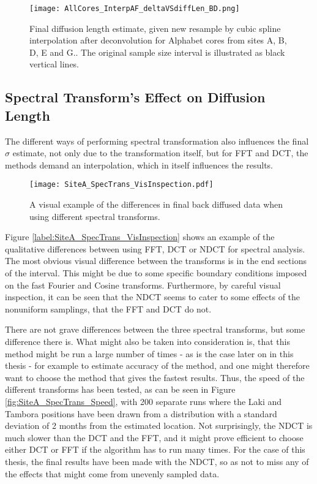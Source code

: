 \documentclass[../../CompleteThesis2/Complete_2ndDraft]{subfiles}
\begin{document}
\begin{figure}[!htb]
	\centering
	\texttt{[image: AllCores\_InterpAF\_deltaVSdiffLen\_BD.png]}
	\caption[Diffusion length versus resampling size after deconvolution, all cores.]{\small Final diffusion length estimate, given new resample by cubic spline interpolation after deconvolution for Alphabet cores from sites A, B, D, E and G.. The original sample size interval is illustrated as black vertical lines.}
	\label{Fig:COMPMETH_AllCores_SamplingVsDiffLen}\textit{}
\end{figure}


\subsection[Spectral Transforms]{Spectral Transform's Effect on Diffusion Length}
\label{Subsec:Method_TestStab_SpecTrans}
The different ways of performing spectral transformation also influences the final $\sigma$ estimate, not only due to the transformation itself, but for FFT and DCT, the methods demand an interpolation, which in itself influences the results. 

\begin{figure}[!htb]
	\centering
	\texttt{[image: SiteA\_SpecTrans\_VisInspection.pdf]}
	\caption[Qualitative Example of Spectral Transform's Effect on $\sigma$]{\small A visual example of the differences in final back diffused data when using different spectral transforms. }
	\label{fig:SiteA_SpecTrans_VisInspection}
\end{figure}

Figure \ref{label:SiteA_SpecTrans_VisInspection} shows an example of the qualitative differences between using FFT, DCT or NDCT for spectral analysis. The most obvious visual difference between the transforms is in the end sections of the interval. This might be due to some specific boundary conditions imposed on the fast Fourier and Cosine transforms. Furthermore, by careful visual inspection, it can be seen that the NDCT seems to cater to some effects of the nonuniform samplings, that the FFT and DCT do not.

There are not grave differences between the three spectral transforms, but some difference there is. What might also be taken into consideration is, that this method might be run a large number of times - as is the case later on in this thesis - for example to estimate accuracy of the method, and one might therefore want to choose the method that gives the fastest results. Thus, the speed of the different transforms has been tested, as can be seen in Figure \ref{fig:SiteA_SpecTrans_Speed}, with 200 separate runs where the Laki and Tambora positions have been drawn from a distribution with a standard deviation of 2 months from the estimated location. Not surprisingly, the NDCT is much slower than the DCT and the FFT, and it might prove efficient to choose either DCT or FFT if the algorithm has to run many times. For the case of this thesis, the final results have been made with the NDCT, so as not to miss any of the effects that might come from unevenly sampled data.
\end{document}
